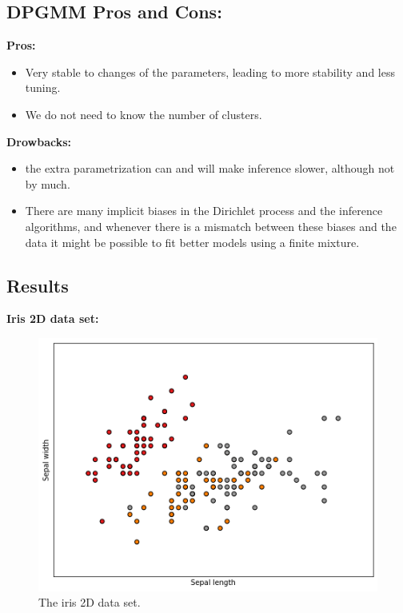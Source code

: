 \documentclass[12pt, a4paper]{paper}
\begin{document}
\subsection*{DPGMM Pros and Cons:}

\textbf{Pros:} 
\begin{itemize}
    \item Very stable to changes of the parameters, leading to more stability and less tuning.
    \item We do not need to know the number of clusters. 
\end{itemize}

\textbf{Drowbacks:}

\begin{itemize}
    \item the extra parametrization can and will make inference slower, although not by much.
    \item There are many implicit biases in the Dirichlet process and the inference algorithms, and whenever there is a mismatch between these biases and the data it might be possible to fit better models using a finite mixture.
\end{itemize}


\newpage

\subsection*{Results}
\textbf{Iris 2D data set:}
\begin{figure}[h!]
\centering
\includegraphics[scale=0.5]{iris_data.png}
\caption{The iris 2D data set.}
\label{fig:DPGMM1}
\end{figure}
\end{document}
